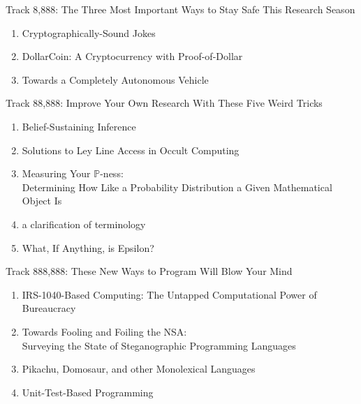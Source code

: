 \documentclass[letter]{article}
\newcommand\track[2]{{\Large Track #1: #2}}
\newcommand\paper[2]{\item \sf #1 \dotfill #2}
\newcommand\keywords[1]{}
\begin{document}
\vspace{4em}

\track{8,888}{The Three Most Important Ways to Stay Safe This Research Season}

\begin{enumerate}
\paper{Cryptographically-Sound Jokes}
{65}
\keywords{jokes, sha, md5}
\paper{DollarCoin: A Cryptocurrency with Proof-of-Dollar}
{67}
\keywords{cryptocurrency,
bitcoin,
dollars,
bills,
gamechanger,
disrupt,
awesome,
supercool,
thebest,
hashtag}
\paper{Towards a Completely Autonomous Vehicle}
{71}
\keywords{pain, suffering, frustration}
\end{enumerate}

\vspace{4em}

\track{88,888}{Improve Your Own Research With These Five Weird Tricks}
\begin{enumerate}
\paper{Belief-Sustaining Inference}
{77}
\keywords{uninformative likelihood,
statistics,
embarrassment,
cognitive dissonance,
inference}
\paper{Solutions to Ley Line Access in Occult Computing}
{83}
\keywords{ley lines,
occult computing,
miskatonic university,
installing linux on a dead badger,
playing god}
\paper{Measuring Your $\mathbb{P}$-ness: \\ Determining How Like a Probability Distribution a Given Mathematical Object Is}
{87}
\keywords{lowbrow humour,
probability,
statistics}
\paper{a clarification of terminology}
{91}
\keywords{did you mean,
search instead for,
not to be confused with}
\paper{What, If Anything, is Epsilon?}
{93}
\keywords{computational archaeology,
epsilon,
very-small and medium-small numbers}
\end{enumerate}

\vspace{4em}

\track{888,888}{These New Ways to Program Will Blow Your Mind}
\begin{enumerate}
\paper{IRS-1040-Based Computing: The Untapped Computational Power of Bureaucracy}
{101}
\keywords{unconventional computation,
taxes,
compilers,
bureaucracy}
\paper{Towards Fooling and Foiling the NSA: \\
Surveying the State of Steganographic Programming Languages}
{103}
\keywords{steganography,
esoteric programming language,
esoteric,
programming languages,
obfuscation,
cryptography,
shit}
\paper{Pikachu, Domosaur, and other Monolexical Languages}
{109}
\keywords{natural language processing,
regular languages,
translation}
\paper{Unit-Test-Based Programming}
{115}
\keywords{unit test,
automatic stubbornness,
holy grail}
\end{enumerate}
\thispagestyle{empty}
\end{document}
